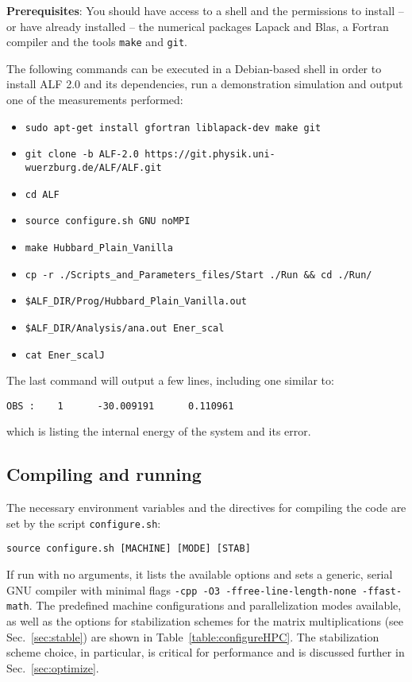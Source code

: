 \textbf{Prerequisites}:
You should have access to a shell and the permissions to install -- or have already installed -- the numerical packages Lapack and Blas, a Fortran compiler and the tools \texttt{make} and \texttt{git}. 

The following commands can be executed in a Debian-based shell in order to install ALF 2.0 and its dependencies, run a demonstration simulation and output one of the measurements performed:
\begin{itemize}[itemsep=0pt]
	\item \lstinline[style=bash,morekeywords={sudo}]{sudo apt-get install gfortran liblapack-dev make git}
	\item \lstinline[style=bash,morekeywords={}]{git clone -b ALF-2.0 https://git.physik.uni-wuerzburg.de/ALF/ALF.git}
	\item \lstinline[style=bash,morekeywords={cd}]{cd ALF}
	\item \lstinline[style=bash,morekeywords={source}]{source configure.sh GNU noMPI}
	\item \lstinline[style=bash,morekeywords={make}]{make Hubbard_Plain_Vanilla}
	\item \lstinline[style=bash,morekeywords={cp}]{cp -r ./Scripts_and_Parameters_files/Start ./Run && cd ./Run/}
	\item \lstinline[style=bash,morekeywords={}]{$ALF_DIR/Prog/Hubbard_Plain_Vanilla.out}
	\item \lstinline[style=bash,morekeywords={}]{$ALF_DIR/Analysis/ana.out Ener_scal}
	\item \lstinline[style=bash,morekeywords={}]{cat Ener_scalJ}
\end{itemize}
The last command will output a few lines, including one similar to:
\begin{lstlisting}[style=bash]
OBS :    1      -30.009191      0.110961
\end{lstlisting}
which is listing the internal energy of the system and its error.

\subsection{Compiling and running}
\label{sec:compilation}

The necessary environment variables and the directives for compiling the code are set by the script \texttt{configure.sh}:
\begin{lstlisting}[style=bash]
source configure.sh [MACHINE] [MODE] [STAB]
\end{lstlisting}
If run with no arguments, it lists the available options and sets a generic, serial GNU compiler with minimal flags \texttt{-cpp -O3 -ffree-line-length-none -ffast-math}. The predefined machine configurations and parallelization modes available, as well as the options for stabilization schemes for the matrix multiplications (see Sec.~\ref{sec:stable}) are shown in Table~\ref{table:configureHPC}. The stabilization scheme choice, in particular, is critical for performance and is discussed further in Sec.~\ref{sec:optimize}.

